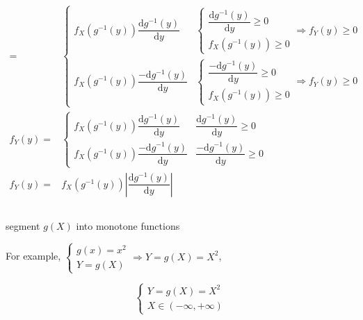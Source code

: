 \documentclass[
]{book}
\theoremstyle{definition}
\theoremstyle{definition}
\theoremstyle{definition}
\theoremstyle{definition}
\theoremstyle{remark}
\begin{document}
\[\begin{aligned}
= & \begin{cases}
f_{{\scriptscriptstyle X}}\left(g^{-1}\left(y\right)\right)\dfrac{\mathrm{d}g^{-1}\left(y\right)}{\mathrm{d}y} & \begin{cases}
\dfrac{\mathrm{d}g^{-1}\left(y\right)}{\mathrm{d}y}\ge0\\
f_{{\scriptscriptstyle X}}\left(g^{-1}\left(y\right)\right)\ge0
\end{cases}\Rightarrow f_{{\scriptscriptstyle Y}}\left(y\right)\ge0\\
f_{{\scriptscriptstyle X}}\left(g^{-1}\left(y\right)\right)\dfrac{-\mathrm{d}g^{-1}\left(y\right)}{\mathrm{d}y} & \begin{cases}
\dfrac{-\mathrm{d}g^{-1}\left(y\right)}{\mathrm{d}y}\ge0\\
f_{{\scriptscriptstyle X}}\left(g^{-1}\left(y\right)\right)\ge0
\end{cases}\Rightarrow f_{{\scriptscriptstyle Y}}\left(y\right)\ge0
\end{cases}\\
f_{{\scriptscriptstyle Y}}\left(y\right)= & \begin{cases}
f_{{\scriptscriptstyle X}}\left(g^{-1}\left(y\right)\right)\dfrac{\mathrm{d}g^{-1}\left(y\right)}{\mathrm{d}y} & \dfrac{\mathrm{d}g^{-1}\left(y\right)}{\mathrm{d}y}\ge0\\
f_{{\scriptscriptstyle X}}\left(g^{-1}\left(y\right)\right)\dfrac{-\mathrm{d}g^{-1}\left(y\right)}{\mathrm{d}y} & \dfrac{-\mathrm{d}g^{-1}\left(y\right)}{\mathrm{d}y}\ge0
\end{cases}\\
f_{{\scriptscriptstyle Y}}\left(y\right)= & f_{{\scriptscriptstyle X}}\left(g^{-1}\left(y\right)\right)\left|\dfrac{\mathrm{d}g^{-1}\left(y\right)}{\mathrm{d}y}\right|
\end{aligned}
\]

\[
\tag*{$\Box$}
\]

segment \(g\left(X\right)\) into monotone functions

For example, \(\begin{cases}
g\left(x\right)=x^{2}\\
Y=g\left(X\right)
\end{cases}\Rightarrow Y=g\left(X\right)=X^{2}\),

\[
\begin{cases}
Y=g\left(X\right)=X^{2}\\
X\in\left(-\infty,+\infty\right)
\end{cases}
\]
\end{document}

